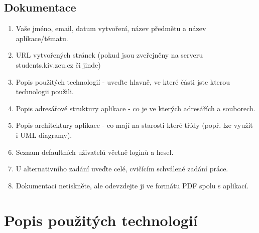 \documentclass[12pt, a4paper]{report}
\begin{document}
\subsection{Dokumentace}
\begin{enumerate}[left=1cm] %
\item Vaše jméno, email, datum vytvoření, název předmětu a název aplikace/tématu.
\item URL vytvořených stránek (pokud jsou zveřejněny na serveru students.kiv.zcu.cz či jinde)
\item Popis použitých technologií - uveďte hlavně, ve které části jste kterou technologii použili.
\item Popis adresářové struktury aplikace - co je ve kterých adresářích a souborech.
\item Popis architektury aplikace - co mají na starosti které třídy (popř. lze využít i UML diagramy).
\item Seznam defaultních uživatelů včetně loginů a hesel.
\item U alternativního zadání uveďte celé, cvičícím schválené zadání práce.
\item Dokumentaci netiskněte, ale odevzdejte ji ve formátu PDF spolu s aplikací.
\end{enumerate}


\section{Popis použitých technologií}
\end{document}
